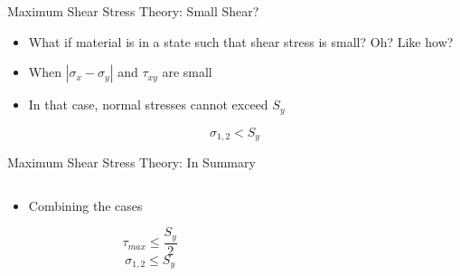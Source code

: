 \documentclass[10pt, svgnames]{beamer}
\begin{document}
\begin{frame}[label={sec:org4cf93e3}]{Maximum Shear Stress Theory: Small Shear?}
\begin{itemize}
\item What if material is in a state such that shear stress is small? Oh? Like how?
\item When \(|\sigma_x - \sigma_y|\) and \(\tau_{xy}\) are small
\item In that case, normal stresses cannot exceed \(S_y\)
\end{itemize}
$$\sigma_{1,2} < S_y $$
\end{frame}

\begin{frame}[label={sec:org005db2a}]{Maximum Shear Stress Theory: In Summary}
\begin{columns}
\begin{column}{0.4\columnwidth}
\begin{itemize}
\item Combining the cases
\end{itemize}
$$\tau_{max} \leqslant \frac{S_y}{2}$$
$$\sigma_{1,2} \leqslant S_y $$
\end{column}

\begin{column}{0.6\columnwidth}
\end{column}
\end{columns}
\end{frame}
\end{document}

